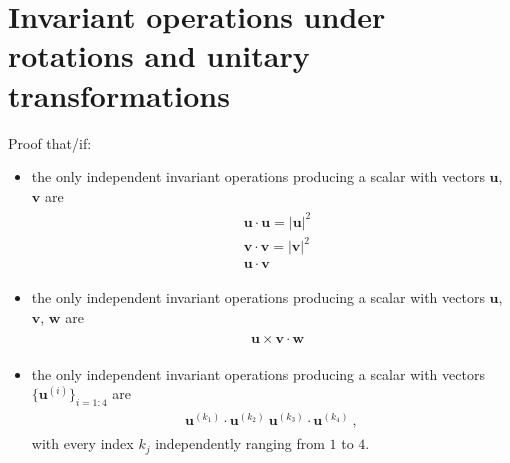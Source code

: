 \documentclass[letterpaper,10pt,english]{jupyterBook}
\begin{document}
\section{Invariant operations under rotations and unitary transformations}
\label{\detokenize{ch/tensor-algebra-calculus/algebra-rotation-tensors:invariant-operations-under-rotations-and-unitary-transformations}}
\sphinxAtStartPar
Proof that/if:
\begin{itemize}
\item {} 
\sphinxAtStartPar
the only independent invariant operations producing a scalar with  vectors \(\mathbf{u}\), \(\mathbf{v}\) are
\begin{equation*}
\begin{split}\begin{aligned}
     & \mathbf{u} \cdot \mathbf{u} = |\mathbf{u}|^2 \\
     & \mathbf{v} \cdot \mathbf{v} = |\mathbf{v}|^2 \\
     & \mathbf{u} \cdot \mathbf{v}
   \end{aligned}\end{split}
\end{equation*}
\item {} 
\sphinxAtStartPar
the only independent invariant operations producing a scalar with  vectors \(\mathbf{u}\), \(\mathbf{v}\), \(\mathbf{w}\) are
\begin{equation*}
\begin{split}\begin{aligned}
     & \mathbf{u} \times \mathbf{v} \cdot \mathbf{w}
   \end{aligned}\end{split}
\end{equation*}
\item {} 
\sphinxAtStartPar
the only independent invariant operations producing a scalar with  vectors \(\{ \mathbf{u}^{(i)} \}_{i=1:4}\) are
\begin{equation*}
\begin{split}\begin{aligned}
     \mathbf{u}^{(k_1)} \cdot \mathbf{u}^{(k_2)} \ \mathbf{u}^{(k_3)} \cdot \mathbf{u}^{(k_4)} \ ,
   \end{aligned}\end{split}
\end{equation*}
\sphinxAtStartPar
with every index \(k_j\) independently ranging from \(1\) to \(4\).

\end{itemize}
\end{document}
